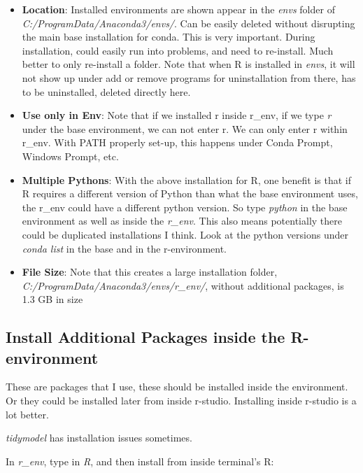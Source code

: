\documentclass[]{article}
\providecommand{\tightlist}{%
  \setlength{\itemsep}{0pt}\setlength{\parskip}{0pt}}
\begin{document}
\begin{itemize}
\tightlist
\item
  \textbf{Location}: Installed environments are shown appear in the
  \emph{envs} folder of \emph{C:/ProgramData/Anaconda3/envs/}. Can be
  easily deleted without disrupting the main base installation for
  conda. This is very important. During installation, could easily run
  into problems, and need to re-install. Much better to only re-install
  a folder. Note that when R is installed in \emph{envs}, it will not
  show up under add or remove programs for uninstallation from there,
  has to be uninstalled, deleted directly here.
\item
  \textbf{Use only in Env}: Note that if we installed r inside r\_env,
  if we type \emph{r} under the base environment, we can not enter r. We
  can only enter r within r\_env. With PATH properly set-up, this
  happens under Conda Prompt, Windows Prompt, etc.
\item
  \textbf{Multiple Pythons}: With the above installation for R, one
  benefit is that if R requires a different version of Python than what
  the base environment uses, the r\_env could have a different python
  version. So type \emph{python} in the base environment as well as
  inside the \emph{r\_env}. This also means potentially there could be
  duplicated installations I think. Look at the python versions under
  \emph{conda list} in the base and in the r-environment.
\item
  \textbf{File Size}: Note that this creates a large installation
  folder, \emph{C:/ProgramData/Anaconda3/envs/r\_env/}, without
  additional packages, is 1.3 GB in size
\end{itemize}

\hypertarget{install-additional-packages-inside-the-r-environment}{%
\subsection{Install Additional Packages inside the
R-environment}\label{install-additional-packages-inside-the-r-environment}}

These are packages that I use, these should be installed inside the
environment. Or they could be installed later from inside r-studio.
Installing inside r-studio is a lot better.

\emph{tidymodel} has installation issues sometimes.

In \emph{r\_env}, type in \emph{R}, and then install from inside
terminal's R:
\end{document}
